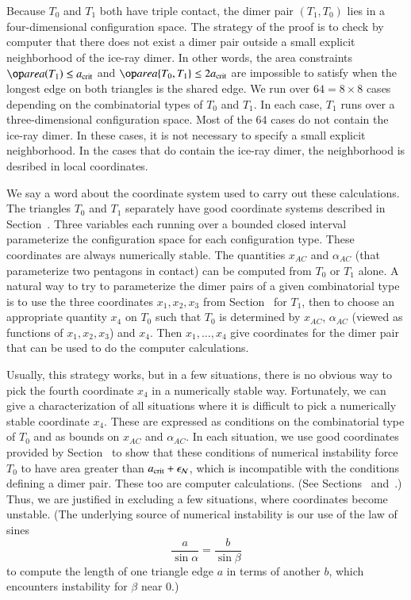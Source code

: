 Because $T_0$ and $T_1$ both have triple contact, the dimer pair
$(T_1,T_0)$ lies in a four-dimensional configuration space.  The
strategy of the proof is to check by computer that there does not
exist a dimer pair outside a small explicit neighborhood of the
ice-ray dimer.  In other words, the area constraints $\area(T_1)\le
\acrit$ and $\area\{T_0,T_1\}\le2\acrit$ are impossible to satisfy
when the longest edge on both triangles is the shared edge.  We run
over $64 = 8\times 8$ cases depending on the combinatorial types of
$T_0$ and $T_1$.  In each case, $T_1$ runs over a three-dimensional
configuration space.  Most of the $64$ cases do not contain the
ice-ray dimer.  In these cases, it is not necessary to specify a small
explicit neighborhood.  In the cases that do contain the ice-ray
dimer, the neighborhood is desribed in local coordinates.

We say a word about the coordinate system used to carry out these
calculations.  The triangles $T_0$ and $T_1$ separately have good
coordinate systems described in Section~.  Three
variables each running over a bounded closed interval parameterize the
configuration space for each configuration type.  These coordinates
are always numerically stable.  The quantities $x_{AC}$ and
$\alpha_{AC}$ (that parameterize two pentagons in contact)
can be computed from $T_0$ or $T_1$ alone.  A natural
way to try to parameterize the dimer pairs of a given combinatorial
type is to use the three coordinates $x_1,x_2,x_3$ from
Section~ for $T_1$, then to choose an appropriate
quantity $x_4$ on $T_0$ such that $T_0$ is determined by $x_{AC}$,
$\alpha_{AC}$ (viewed as functions of $x_1,x_2,x_3$) and $x_4$.  Then
$x_1,\ldots,x_4$ give coordinates for the dimer pair that can be used
to do the computer calculations.

Usually, this strategy works, but in a few situations, there is no
obvious way to pick the fourth coordinate $x_4$ in a numerically
stable way.  Fortunately, we can give a characterization of all
situations where it is difficult to pick a numerically stable
coordinate $x_4$.  These are expressed as conditions on the
combinatorial type of $T_0$ and as bounds on $x_{AC}$ and
$\alpha_{AC}$.  In each situation, we use good coordinates provided by
Section~ to show that these conditions of numerical
instability force $T_0$ to have area greater than $a_\text{crit}+\epsilon_{\mathcal N}$,
which is incompatible with the conditions defining a dimer pair.
These too are computer calculations.  (See Sections~
and~.)  Thus, we are justified in excluding a few
situations, where coordinates become unstable.  (The underlying source
of numerical instability is our use of the law of sines
\[
\frac{a}{\sin\alpha} = \frac{b}{\sin\beta}
\]
to compute the length of one triangle edge $a$ in terms of another
$b$, which encounters instability for $\beta$ near $0$.)

